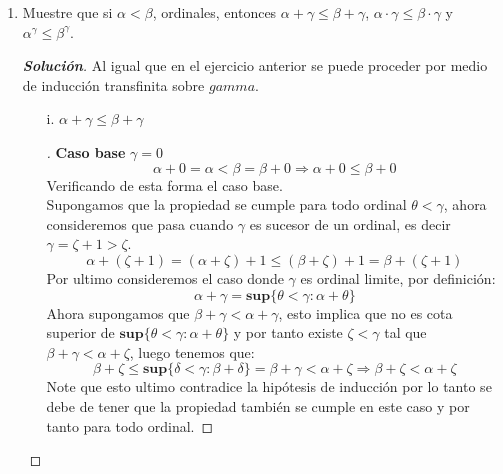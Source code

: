 \documentclass[11pt]{article}
\numberwithin{equation}{section}
\numberwithin{figure}{section}
\begin{document}
\begin{enumerate}
\begin{proof}[\textbf{Solución}]
\begin{itemize}
\begin{equation*}
            (\alpha^\beta)^\gamma=\textbf{sup}\{\theta<\gamma:(\alpha^\beta)^\theta\}=\textbf{sup}\{\theta<\gamma:\alpha^{\beta\cdot\theta}\}=\alpha^{\beta\cdot\gamma} 
         \end{equation*}
    De esta forma se prueba que la propiedad se cumple para todo ordinal.
    \end{itemize}
    \end{proof}
    \item Muestre que si $\alpha<\beta$, ordinales, entonces $\alpha+\gamma\leq\beta+\gamma$, $\alpha\cdot\gamma\leq\beta\cdot\gamma$ y  $\alpha^\gamma\leq\beta^\gamma$.
    \begin{proof}[\textbf{Solución}]
    Al igual que en el ejercicio anterior se puede proceder por medio de inducción transfinita sobre $gamma$.
    \begin{itemize}
        \item[i.]$\alpha+\gamma\leq\beta+\gamma$
        \begin{proof}[\unskip\nopunct]
        \textbf{Caso base} $\gamma=0$
        \begin{equation*}
            \alpha+0=\alpha<\beta=\beta+0\Rightarrow\alpha+0\leq\beta+0
        \end{equation*}
        Verificando de esta forma el caso base.\\
        Supongamos que la propiedad se cumple para todo ordinal $\theta<\gamma$, ahora consideremos que pasa cuando $\gamma$ es sucesor de un ordinal, es decir $\gamma=\zeta+1>\zeta$.
        \begin{equation*}
            \alpha+(\zeta+1)=(\alpha+\zeta)+1\leq(\beta+\zeta)+1=\beta+(\zeta+1)
        \end{equation*}
        Por ultimo consideremos el caso donde $\gamma$ es ordinal limite, por definición:
        \begin{equation*}
            \alpha+\gamma=\textbf{sup}\{\theta<\gamma:\alpha+\theta\}
        \end{equation*}
        Ahora supongamos que $\beta+\gamma<\alpha+\gamma$, esto implica que no es cota superior de $\textbf{sup}\{\theta<\gamma:\alpha+\theta\}$ y por tanto existe $\zeta<\gamma$ tal que $\beta+\gamma<\alpha+\zeta$, luego tenemos que:
        \begin{equation*}
            \beta+\zeta\leq\textbf{sup}\{\delta<\gamma:\beta+\delta\}=\beta+\gamma<\alpha+\zeta\Rightarrow\beta+\zeta<\alpha+\zeta
        \end{equation*}
        Note que esto ultimo contradice la hipótesis de inducción por lo tanto se debe de tener que la propiedad también se cumple en este caso y por tanto para todo ordinal.

\end{proof}
\end{itemize}
\end{proof}
\end{enumerate}
\end{document}

